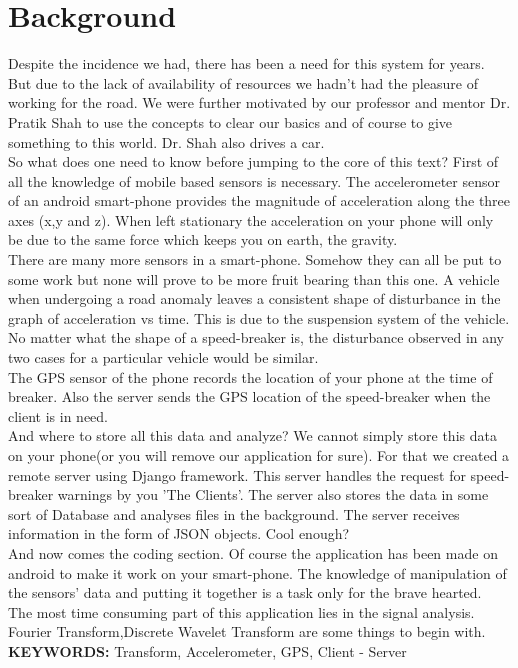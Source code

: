 \documentclass[12pt,twocolumn]{article}
\begin{document}
\section{Background}
Despite the incidence we had, there has been a need for this system for years. But due to the lack of availability of resources we hadn't had the pleasure of working for the road. We were further motivated by our professor and mentor Dr. Pratik Shah to use the concepts to clear our basics and of course to give something to this world. Dr. Shah also drives a car.\\
So what does one need to know before jumping to the core of this text? First of all the knowledge of mobile based sensors is necessary. The accelerometer sensor of an android smart-phone provides the magnitude of acceleration along the three axes (x,y and z). When left stationary the acceleration on your phone will only be due to the same force which keeps you on earth, the gravity.\\
There are many more sensors in a smart-phone. Somehow they can all be put to some work but none will prove to be more fruit bearing than this one.
A vehicle when undergoing a road anomaly leaves a consistent shape of disturbance in the graph of acceleration vs time. This is due to the suspension system of the vehicle. No matter what the shape of a speed-breaker is, the disturbance observed in any two cases for a particular vehicle would be similar.\\
The GPS sensor of the phone records the location of your phone at the time of breaker. Also the server sends the GPS location of the speed-breaker when the client is in need.\\
And where to store all this data and analyze? We cannot simply store this data on your phone(or you will remove our application for sure). For that we created a remote server using Django framework. This server handles the request for speed-breaker warnings by you 'The Clients'. The server also stores the data in some sort of Database and analyses files in the background. The server receives information in the form of JSON objects.
Cool enough?\\
And now comes the coding section. Of course the application has been made on android to make it work on your smart-phone. The knowledge of manipulation of the sensors' data and putting it together is a task only for the brave hearted.\\
The most time consuming part of this application lies in the signal analysis. Fourier Transform,Discrete Wavelet Transform are some things to begin with.\\
\textbf{KEYWORDS:} Transform, Accelerometer, GPS, Client - Server  \\
\end{document}
